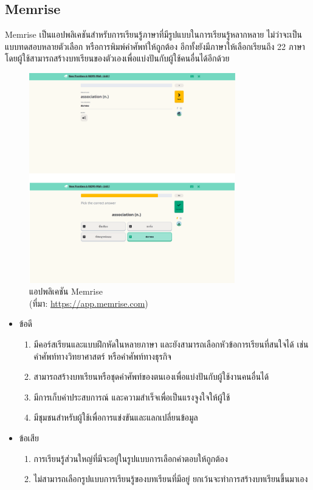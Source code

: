 \documentclass[12pt,oneside,openright,a4paper]{cpe-thai-project}
\begin{document}
\pagebreak
\subsection{Memrise}

\hspace{1cm}
Memrise \cite{Memrise} เป็นแอปพลิเคชันสำหรับการเรียนรู้ภาษาที่มีรูปแบบในการเรียนรู้หลากหลาย ไม่ว่าจะเป็นแบบทดสอบหลายตัวเลือก
หรือการพิมพ์คำศัพท์ให้ถูกต้อง อีกทั้งยังมีภาษาให้เลือกเรียนถึง 22 ภาษา โดยผู้ใช้สามารถสร้างบทเรียนของตัวเองเพื่อแบ่งปันกับผู้ใช้คนอื่นได้อีกด้วย

\begin{figure}[!h]\centering
	\includegraphics[width=0.8\textwidth, keepaspectratio=true]{image/chap2/memriseEX.png}
	\caption[แอปพลิเคชัน Memrise]{แอปพลิเคชัน Memrise \\ (ที่มา: \href {https://app.memrise.com} {https://app.memrise.com})\centering}\label{fig:mimriseEx}
\end{figure}

\begin{itemize}
	\item ข้อดี
	      \begin{enumerate}
		      \item มีคอร์สเรียนและแบบฝึกหัดในหลายภาษา และยังสามารถเลือกหัวข้อการเรียนที่สนใจได้ เช่นคำศัพท์ทางวิทยาศาสตร์ หรือคำศัพท์ทางธุรกิจ
		      \item สามารถสร้างบทเรียนหรือชุดคำศัพท์ของตนเองเพื่อแบ่งปันกับผู้ใช้งานคนอื่นได้
		      \item มีการเก็บค่าประสบการณ์ และความสำเร็จเพื่อเป็นแรงจูงใจให้ผู้ใช้
		      \item มีชุมชนสำหรับผู้ใช้เพื่อการแข่งขันและแลกเปลี่ยนข้อมูล
	      \end{enumerate}
	\item ข้อเสีย
	      \begin{enumerate}
		      \item การเรียนรู้ส่วนใหญ่ที่มีจะอยู่ในรูปแบบการเลือกคำตอบให้ถูกต้อง
		      \item ไม่สามารถเลือกรูปแบบการเรียนรู้ของบทเรียนที่มีอยู่ ยกเว้นจะทำการสร้างบทเรียนขึ้นมาเอง
	      \end{enumerate}
\end{itemize}
\end{document}
